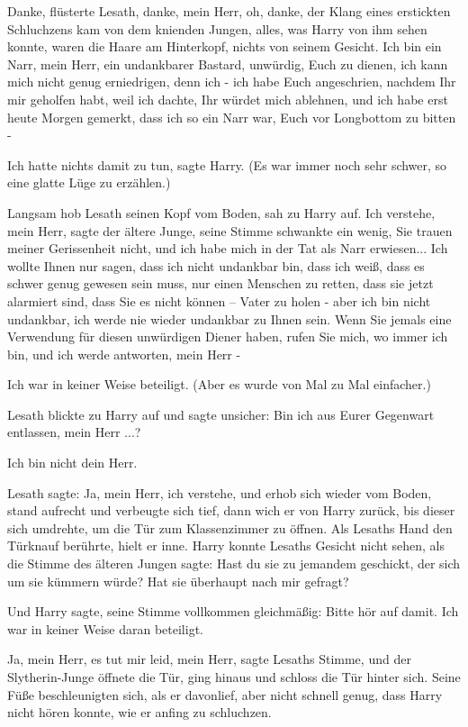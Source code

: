 \glqq{}Danke, \glqq{} flüsterte Lesath, \glqq{}danke, mein Herr, oh, danke\grqq{},
der Klang eines erstickten Schluchzens kam von dem knienden Jungen, alles, was
Harry von ihm sehen konnte, waren die Haare am Hinterkopf, nichts von seinem
Gesicht. \glqq{}Ich bin ein Narr, mein Herr, ein undankbarer Bastard, unwürdig,
Euch zu dienen, ich kann mich nicht genug erniedrigen, denn ich - ich habe Euch
angeschrien, nachdem Ihr mir geholfen habt, weil ich dachte, Ihr würdet mich
ablehnen, und ich habe erst heute Morgen gemerkt, dass ich so ein Narr war, Euch
vor Longbottom zu bitten -\grqq{}

\glqq{}Ich hatte nichts damit zu tun\grqq{}, sagte Harry. (Es war immer noch sehr
schwer, so eine glatte Lüge zu erzählen.)

Langsam hob Lesath seinen Kopf vom Boden, sah zu Harry auf. \glqq{}Ich verstehe,
mein Herr\grqq{}, sagte der ältere Junge, seine Stimme schwankte ein wenig,
\glqq{}Sie trauen meiner Gerissenheit nicht, und ich habe mich in der Tat als
Narr erwiesen... Ich wollte Ihnen nur sagen, dass ich nicht undankbar bin, dass
ich weiß, dass es schwer genug gewesen sein muss, nur einen Menschen zu retten,
dass sie jetzt alarmiert sind, dass Sie es nicht können – Vater zu holen - aber
ich bin nicht undankbar, ich werde nie wieder undankbar zu Ihnen sein. Wenn Sie
jemals eine Verwendung für diesen unwürdigen Diener haben, rufen Sie mich, wo
immer ich bin, und ich werde antworten, mein Herr -\grqq{}

\glqq{}Ich war in keiner Weise beteiligt.\grqq{} (Aber es wurde von Mal zu Mal
einfacher.)

Lesath blickte zu Harry auf und sagte unsicher: \glqq{}Bin ich aus Eurer
Gegenwart entlassen, mein Herr ...?\grqq{}

\glqq{}Ich bin nicht dein Herr.\grqq{}

Lesath sagte: \glqq{}Ja, mein Herr, ich verstehe\grqq{}, und erhob sich wieder
vom Boden, stand aufrecht und verbeugte sich tief, dann wich er von Harry
zurück, bis dieser sich umdrehte, um die Tür zum Klassenzimmer zu öffnen. Als
Lesaths Hand den Türknauf berührte, hielt er inne. Harry konnte Lesaths Gesicht
nicht sehen, als die Stimme des älteren Jungen sagte: \glqq{}Hast du sie zu
jemandem geschickt, der sich um sie kümmern würde? Hat sie überhaupt nach mir
gefragt?\grqq{}

Und Harry sagte, seine Stimme vollkommen gleichmäßig: \glqq{}Bitte hör auf damit.
Ich war in keiner Weise daran beteiligt.\grqq{}

\glqq{}Ja, mein Herr, es tut mir leid, mein Herr\grqq{}, sagte Lesaths Stimme,
und der Slytherin-Junge öffnete die Tür, ging hinaus und schloss die Tür hinter
sich. Seine Füße beschleunigten sich, als er davonlief, aber nicht schnell
genug, dass Harry nicht hören konnte, wie er anfing zu schluchzen.

